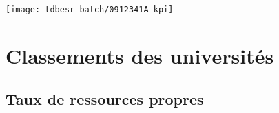 \documentclass[12pt,french,]{article}
\def\arraystretch{1.5}
\begin{document}
\begin{center}\texttt{[image: tdbesr-batch/0912341A-kpi]} \end{center}

\newpage

\hypertarget{classements-des-universituxe9s}{%
\section{Classements des
universités}\label{classements-des-universituxe9s}}

\footnotesize
\def\arraystretch{1.4}

\hypertarget{taux-de-ressources-propres}{%
\subsection{Taux de ressources
propres}\label{taux-de-ressources-propres}}
\end{document}
